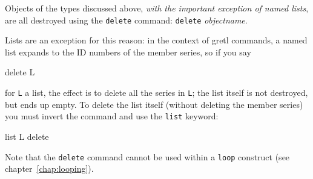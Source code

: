 Objects of the types discussed above, \textit{with the important
  exception of named lists}, are all destroyed using the
\texttt{delete} command: \texttt{delete} \textsl{objectname}.

Lists are an exception for this reason: in the context of gretl
commands, a named list expands to the ID numbers of the member series,
so if you say

\begin{code}
delete L
\end{code} 

for \texttt{L} a list, the effect is to delete all the series in
\texttt{L}; the list itself is not destroyed, but ends up empty.  To
delete the list itself (without deleting the member series) you must
invert the command and use the \texttt{list} keyword:

\begin{code}
list L delete
\end{code}

Note that the \texttt{delete} command cannot be used within a
\texttt{loop} construct (see chapter~\ref{chap:looping}).
